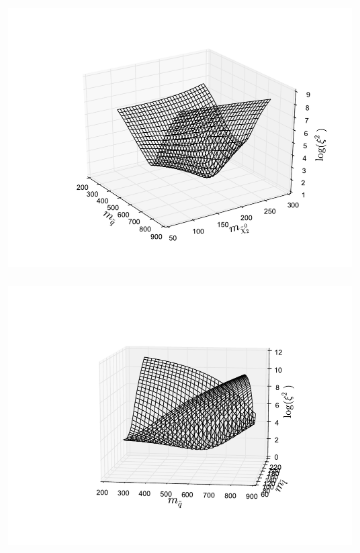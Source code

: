 \documentclass[twoside,english]{uiofysmaster}
\begin{document}
\begin{figure}[hbt]
	\centering
	\begin{subfigure}[b]{0.49\textwidth}
		\includegraphics[width=\textwidth]{figures/3D_plot_xisquared_25_herwig_events_squark-chi2.pdf} 
		\caption{}
		\label{fig:3D_masses1}
	\end{subfigure}
	\begin{subfigure}[b]{0.49\textwidth}
		\includegraphics[width=\textwidth]{figures/3D_plot_xisquared_25_herwig_events_squark-slepton.pdf} 
		\caption{}
		\label{fig:3D_masses2}
	\end{subfigure}


\end{figure}
\end{document}
